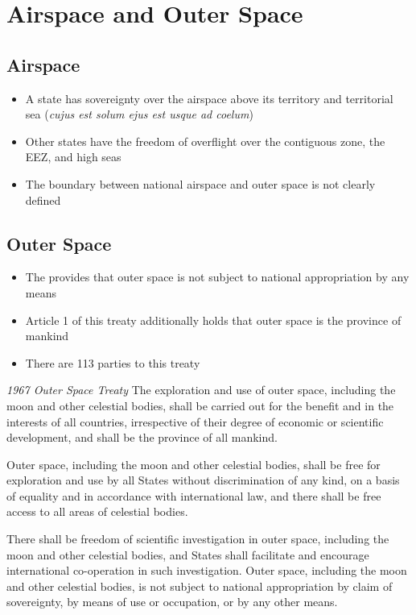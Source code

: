 \section{Airspace and Outer Space}

\subsection{Airspace}
\begin{itemize}
    \item A state has sovereignty over the airspace above its territory and territorial sea (\textit{cujus est solum ejus est usque ad coelum})
    \item Other states have the freedom of overflight over the contiguous zone, the EEZ, and high seas
    \item The boundary between national airspace and outer space is not clearly defined
\end{itemize}

\subsection{Outer Space}
\begin{itemize}
    \item The  provides that outer space is not subject to national appropriation by any means
    \item Article 1 of this treaty additionally holds that outer space is the province of mankind
    \item There are 113 parties to this treaty
\end{itemize}

\begin{conventiondetails}{\textit{1967 Outer Space Treaty}}
    \flushleft
    The exploration and use of outer space, including the moon and other celestial bodies, shall be carried out for the benefit and in the interests of all countries, irrespective of their degree of economic or scientific development, and shall be the province of all mankind.

    \vspace{\baselineskip}
    
    Outer space, including the moon and other celestial bodies, shall be free for exploration and use by all States without discrimination of any kind, on a basis of equality and in accordance with international law, and there shall be free access to all areas of celestial bodies.

    \vspace{\baselineskip}
    
    There shall be freedom of scientific investigation in outer space, including the moon and other celestial bodies, and States shall facilitate and encourage international co-operation in such investigation.
    Outer space, including the moon and other celestial bodies, is not subject to national appropriation by claim of sovereignty, by means of use or occupation, or by any other means.
\end{conventiondetails}

